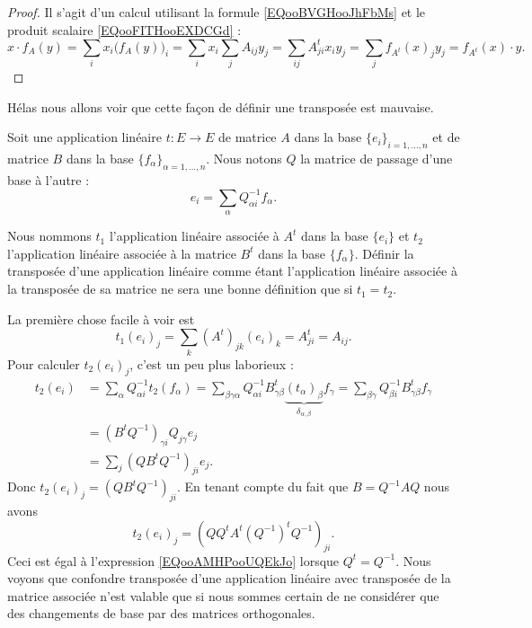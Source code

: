 \begin{proof}
    Il s'agit d'un calcul utilisant la formule \eqref{EQooBVGHooJhFbMs} et le produit scalaire \eqref{EQooFITHooEXDCGd} :
    \begin{equation}
        x\cdot f_A(y)=\sum_ix_i\big( f_A(y) \big)_i=\sum_ix_i\sum_jA_{ij}y_j=\sum_{ij}A^t_{ji}x_iy_j=\sum_jf_{A^t}(x)_jy_j=f_{A^t}(x)\cdot y.
    \end{equation}
\end{proof}

Hélas nous allons voir que cette façon de définir une transposée est mauvaise.

Soit une application linéaire \( t\colon E\to E\) de matrice \( A\) dans la base \( \{ e_i \}_{i=1,\ldots, n}\) et de matrice \( B\) dans la base \( \{ f_{\alpha} \}_{\alpha=1,\ldots, n}\). Nous notons \( Q\) la matrice de passage d'une base à l'autre :
\begin{equation}
    e_i=\sum_{\alpha}Q_{\alpha i}^{-1}f_{\alpha}.
\end{equation}

Nous nommons \( t_1\) l'application linéaire associée à \( A^t\) dans la base \( \{ e_i \}\) et \( t_2\) l'application linéaire associée à la matrice \( B^t\) dans la base \( \{ f_{\alpha} \}\). Définir la transposée d'une application linéaire comme étant l'application linéaire associée à la transposée de sa matrice ne sera une bonne définition que si \( t_1=t_2\).

La première chose facile à voir est
\begin{equation}        \label{EQooAMHPooUQEkJo}
    t_1(e_i)_j=\sum_k(A^t)_{jk}(e_i)_k=A^t_{ji}=A_{ij}.
\end{equation}
Pour calculer \( t_2(e_i)_j\), c'est un peu plus laborieux :
\begin{subequations}
    \begin{align}
        t_2(e_i)  & =\sum_{\alpha}Q_{\alpha i}^{-1} t_2(f_\alpha)=\sum_{\beta\gamma\alpha}Q_{\alpha i}^{-1}B^t_{\gamma\beta}\underbrace{(t_{\alpha})_{\beta}}_{\delta_{\alpha,\beta}}f_{\gamma}=\sum_{\beta\gamma}Q_{\beta i}^{-1}B^t_{\gamma\beta}f_{\gamma}  \\
                  & =(B^tQ^{-1})_{\gamma i}Q_{j\gamma}e_j\\
                  & =\sum_j(QB^tQ^{-1})_{ji}e_j.
    \end{align}
\end{subequations}
Donc \( t_2(e_i)_j=(QB^tQ^{-1})_{ji}\). En tenant compte du fait que \( B=Q^{-1}AQ\) nous avons
\begin{equation}
    t_2(e_i)_j=(QQ^tA^t(Q^{-1})^tQ^{-1})_{ji}.
\end{equation}
Ceci est égal à l'expression \eqref{EQooAMHPooUQEkJo} lorsque \( Q^t=Q^{-1}\). Nous voyons que confondre transposée d'une application linéaire avec transposée de la matrice associée n'est valable que si nous sommes certain de ne considérer que des changements de base par des matrices orthogonales.

